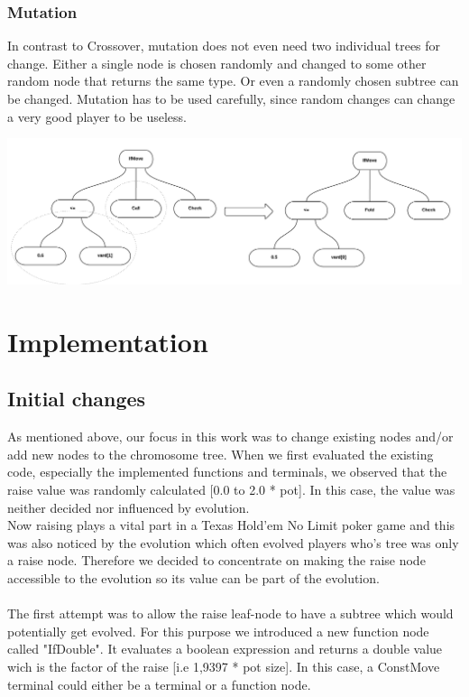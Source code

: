 \documentclass[12pt,fleqn,a4paper]{article}
\begin{document}
\subsubsection{Mutation}
In contrast to Crossover, mutation does not even need two individual trees for change.
Either a single node is chosen randomly and changed to some other random node that returns the same type.
Or even a randomly chosen subtree can be changed.
Mutation has to be used carefully, since random changes can change a very good player to be useless.

\begin{center}
	\includegraphics[width=1.0\textwidth]{tree_mutation.png}
\end{center}

\newpage
\section{Implementation}
\subsection{Initial changes}
As mentioned above, our focus in this work was to change existing nodes and/or add
new nodes to the chromosome tree. When we first evaluated the existing code, especially the implemented functions and terminals, we observed that the raise value was randomly calculated [0.0 to 2.0 * pot]. In this case, the value was neither decided nor influenced by evolution. \\
Now raising plays a vital part in a Texas Hold'em No Limit poker game and this was also noticed by the evolution which often evolved players who's tree was only a raise node.
Therefore we decided to concentrate on making the raise node accessible to the evolution so its value can be part of the evolution.
\\ \\ 
The first attempt was to allow the raise leaf-node to have a subtree which would potentially get evolved. For this purpose we introduced a new function node called "IfDouble". It evaluates a boolean expression and returns a double value wich is the factor of the raise [i.e 1,9397 * pot size]. In this case, a ConstMove terminal could either be a terminal or a function node.
\end{document}
